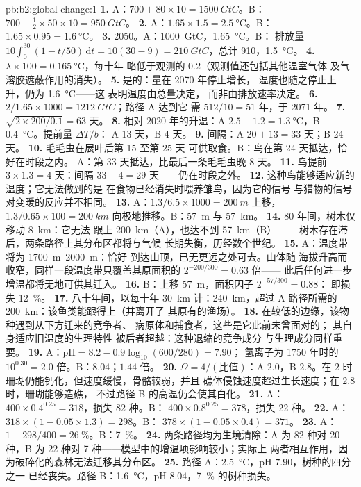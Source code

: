 \begin{solution}{pb:b2:global-change:1}
\textbf{1.} A：$700 + 80\times 10 = \qty{1500}{GtC}$。B：$700 +
\tfrac12\times 50\times 10 = \qty{950}{GtC}$。
\textbf{2.} A：$1.65\times 1.5 = \qty{2.5}{\celsius}$。B：
$1.65\times 0.95 = \qty{1.6}{\celsius}$。
\textbf{3.} 2050。A：\qty{1000}{GtC}，\qty{1.65}{\celsius}。B：
排放量 $10\int_0^{30}(1 - t/50)\,\mathrm{d}t = 10(30 - 9) =
\qty{210}{GtC}$，总计 910，\qty{1.5}{\celsius}。
\textbf{4.} $\lambda\times 100 = \qty{0.165}{\celsius}$，每十年
略低于观测的 $0.2$（观测值还包括其他温室气体
及气溶胶遮蔽作用的消失）。
\textbf{5.} 是的：量在 2070 年停止增长，
温度也随之停止上升，仍为 \qty{1.6}{\celsius}——这
表明温度由总量决定，
而非由排放速率决定。
\textbf{6.} $2/1.65\times 1000 = \qty{1212}{GtC}$；路径 A 达到它
需 $512/10 = 51$ 年，于 2071 年。
\textbf{7.} $\sqrt{2\times 200/0.1} = 63$ 天。
\textbf{8.} 相对 2020 年的升温：A $2.5 - 1.2 =
\qty{1.3}{\celsius}$，B \qty{0.4}{\celsius}。提前量 $\Delta T/b$：
A 13 天，B 4 天。
\textbf{9.} 间隔：A $20 + 13 = 33$ 天；B 24 天。
\textbf{10.} 毛毛虫在展叶后第 15 至第 25 天
可供取食。B：鸟在第 24 天抵达，恰好在时段之内。
A：第 33 天抵达，比最后一条毛毛虫晚 8 天。
\textbf{11.} 鸟提前 $3\times 1.3 = 4$ 天：间隔 $33 - 4 =
29$ 天——仍在时段之外。
\textbf{12.} 这种鸟能够适应新的温度；它无法做到的是
在食物已经消失时喂养雏鸟，因为它的信号
与猎物的信号对变暖的反应并不相同。
\textbf{13.} A：$1.3/6.5\times 1000 = \qty{200}{m}$ 上移，
$1.3/0.65\times 100 = \qty{200}{km}$ 向极地推移。B：\qty{57}{m} 与
\qty{57}{km}。
\textbf{14.} 80 年间，树木仅移动 \qty{8}{km}：它无法
跟上 \qty{200}{km}（A），也达不到 \qty{57}{km}（B）——
树木存在滞后，两条路径上其分布区都将与气候
长期失衡，历经数个世纪。
\textbf{15.} A：温度带将为 \qtyrange{1700}{2000}{m}：恰好
到达山顶，已无更远之处可去。山体随
海拔升高而收窄，同样一段温度带只覆盖其原面积的
$2^{-200/300} = 0.63$ 倍——
此后任何进一步增温都将无地可供其迁入。
\textbf{16.} B：上移 \qty{57}{m}，面积因子 $2^{-57/300} = 0.88$：
即损失 \qty{12}{\%}。
\textbf{17.} 八十年间，以每十年 \qty{30}{km} 计：\qty{240}{km}，超过
A 路径所需的 \qty{200}{km}：该鱼类能跟得上（并离开了
其原有的渔场）。
\textbf{18.} 在较低的边缘，该物种遇到从下方迁来的竞争者、
病原体和捕食者，这些是它此前未曾面对的；
其自身适应旧温度的生理特性
被后者超越：这种退缩的竞争成分
与生理成分同样重要。
\textbf{19.} A：$\mathrm{pH} = 8.2 - 0.9\log_{10}(600/280) = 7.90$；
氢离子为 1750 年时的 $10^{0.30} = 2.0$ 倍。B：$8.04$；$1.44$
倍。
\textbf{20.} $\Omega = 4/(\text{比值})$：A $2.0$，B $2.8$。在 2 时
珊瑚仍能钙化，但速度缓慢，骨骼较弱，并且
礁体侵蚀速度超过生长速度；在 $2.8$ 时，珊瑚能够造礁，
不过路径 B 的高温仍会使其白化。
\textbf{21.} A：$400\times 0.4^{0.25} = 318$，损失 82 种。B：
$400\times 0.8^{0.25} = 378$，损失 22 种。
\textbf{22.} A：$318\times(1 - 0.05\times 1.3) = 298$。B：
$378\times(1 - 0.05\times 0.4) = 371$。
\textbf{23.} A：$1 - 298/400 = \qty{26}{\%}$。B：\qty{7}{\%}。
\textbf{24.} 两条路径均为生境清除：A 为 82 种对 20 种，B 为 22 种对
7 种——模型中的增温项影响较小；实际上
两者相互作用，因为破碎化的森林无法迁移其分布区。
\textbf{25.} 路径 A：\qty{2.5}{\celsius}，pH $7.90$，树种的四分之一
已经丧失。路径 B：\qty{1.6}{\celsius}，pH $8.04$，\qty{7}{\%}
的树种损失。
\end{solution}
